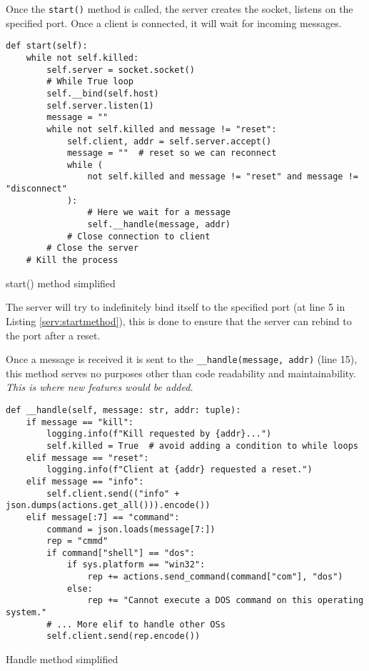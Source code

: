 \documentclass{article}
\begin{document}
Once the \verb|start()| method is called, the server creates the socket, listens
on the specified port. Once a client is connected, it will wait for incoming
messages.

\begin{listing}[H]
    \begin{verbatim}
def start(self):
    while not self.killed:
        self.server = socket.socket()
        # While True loop
        self.__bind(self.host)
        self.server.listen(1)
        message = ""
        while not self.killed and message != "reset":
            self.client, addr = self.server.accept()
            message = ""  # reset so we can reconnect
            while (
                not self.killed and message != "reset" and message != "disconnect"
            ):
                # Here we wait for a message
                self.__handle(message, addr)
            # Close connection to client
        # Close the server
    # Kill the process
    \end{verbatim}
    \caption{start() method simplified}
    \label{serv:startmethod}
\end{listing}
The server will try to indefinitely bind itself to the specified port (at line 5
in Listing \ref{serv:startmethod}), this is done to ensure that the server can rebind to
the port after a reset.

Once a message is received it is sent to the \verb|__handle(message, addr)|
(line 15), this method serves no purposes other than code readability and
maintainability. \emph{This is where new features would be added.}

\begin{listing}[H]
    \begin{verbatim}
def __handle(self, message: str, addr: tuple):
    if message == "kill":
        logging.info(f"Kill requested by {addr}...")
        self.killed = True  # avoid adding a condition to while loops
    elif message == "reset":
        logging.info(f"Client at {addr} requested a reset.")
    elif message == "info":
        self.client.send(("info" + json.dumps(actions.get_all())).encode())
    elif message[:7] == "command":
        command = json.loads(message[7:])
        rep = "cmmd"
        if command["shell"] == "dos":
            if sys.platform == "win32":
                rep += actions.send_command(command["com"], "dos")
            else:
                rep += "Cannot execute a DOS command on this operating system."
        # ... More elif to handle other OSs
        self.client.send(rep.encode())
    \end{verbatim}
    \caption{Handle method simplified}
    \label{serv:handlemethod}
\end{listing}
\end{document}
